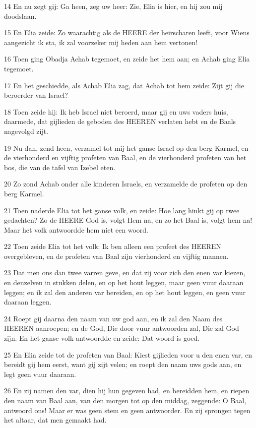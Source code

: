 \par 14 En nu zegt gij: Ga heen, zeg uw heer: Zie, Elia is hier, en hij zou mij doodslaan.
\par 15 En Elia zeide: Zo waarachtig als de HEERE der heirscharen leeft, voor Wiens aangezicht ik sta, ik zal voorzeker mij heden aan hem vertonen!
\par 16 Toen ging Obadja Achab tegemoet, en zeide het hem aan; en Achab ging Elia tegemoet.
\par 17 En het geschiedde, als Achab Elia zag, dat Achab tot hem zeide: Zijt gij die beroerder van Israel?
\par 18 Toen zeide hij: Ik heb Israel niet beroerd, maar gij en uws vaders huis, daarmede, dat gijlieden de geboden des HEEREN verlaten hebt en de Baals nagevolgd zijt.
\par 19 Nu dan, zend heen, verzamel tot mij het ganse Israel op den berg Karmel, en de vierhonderd en vijftig profeten van Baal, en de vierhonderd profeten van het bos, die van de tafel van Izebel eten.
\par 20 Zo zond Achab onder alle kinderen Israels, en verzamelde de profeten op den berg Karmel.
\par 21 Toen naderde Elia tot het ganse volk, en zeide: Hoe lang hinkt gij op twee gedachten? Zo de HEERE God is, volgt Hem na, en zo het Baal is, volgt hem na! Maar het volk antwoordde hem niet een woord.
\par 22 Toen zeide Elia tot het volk: Ik ben alleen een profeet des HEEREN overgebleven, en de profeten van Baal zijn vierhonderd en vijftig mannen.
\par 23 Dat men ons dan twee varren geve, en dat zij voor zich den enen var kiezen, en denzelven in stukken delen, en op het hout leggen, maar geen vuur daaraan leggen; en ik zal den anderen var bereiden, en op het hout leggen, en geen vuur daaraan leggen.
\par 24 Roept gij daarna den naam van uw god aan, en ik zal den Naam des HEEREN aanroepen; en de God, Die door vuur antwoorden zal, Die zal God zijn. En het ganse volk antwoordde en zeide: Dat woord is goed.
\par 25 En Elia zeide tot de profeten van Baal: Kiest gijlieden voor u den enen var, en bereidt gij hem eerst, want gij zijt velen; en roept den naam uws gods aan, en legt geen vuur daaraan.
\par 26 En zij namen den var, dien hij hun gegeven had, en bereidden hem, en riepen den naam van Baal aan, van den morgen tot op den middag, zeggende: O Baal, antwoord ons! Maar er was geen stem en geen antwoorder. En zij sprongen tegen het altaar, dat men gemaakt had.
